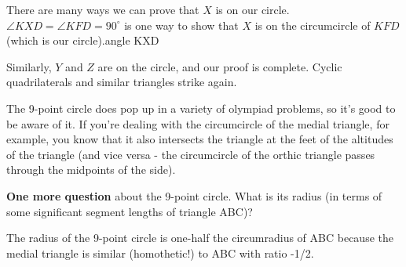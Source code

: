 

There are many ways we can prove that $X$ is on our circle. $\angle KXD = \angle KFD = 90^\circ$ is one way to show that $X$ is on the circumcircle of $KFD$ (which is our circle).angle KXD

Similarly, $Y$ and $Z$ are on the circle, and our proof is complete. Cyclic quadrilaterals and similar triangles strike again.

The 9-point circle does pop up in a variety of olympiad problems, so it's good to be aware of it. If you're dealing with the circumcircle of the medial triangle, for example, you know that it also intersects the triangle at the feet of the altitudes of the triangle (and vice versa - the circumcircle of the orthic triangle passes through the midpoints of the side).

\vspace{6pt}
\textbf{One more question} about the 9-point circle. What is its radius (in terms of some significant segment lengths of triangle ABC)?







The radius of the 9-point circle is one-half the circumradius of ABC because the medial triangle is similar (homothetic!) to ABC with ratio -1/2.


